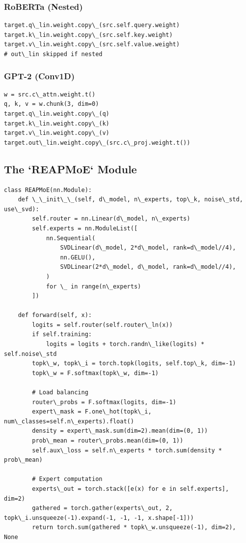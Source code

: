 \subsubsection{RoBERTa (Nested)}

\begin{lstlisting}
target.q\_lin.weight.copy\_(src.self.query.weight)
target.k\_lin.weight.copy\_(src.self.key.weight)
target.v\_lin.weight.copy\_(src.self.value.weight)
# out\_lin skipped if nested
\end{lstlisting}

\subsubsection{GPT-2 (Conv1D)}

\begin{lstlisting}
w = src.c\_attn.weight.t()
q, k, v = w.chunk(3, dim=0)
target.q\_lin.weight.copy\_(q)
target.k\_lin.weight.copy\_(k)
target.v\_lin.weight.copy\_(v)
target.out\_lin.weight.copy\_(src.c\_proj.weight.t())
\end{lstlisting}

\subsection{The `REAPMoE` Module}

\begin{lstlisting}
class REAPMoE(nn.Module):
    def \_\_init\_\_(self, d\_model, n\_experts, top\_k, noise\_std, use\_svd):
        self.router = nn.Linear(d\_model, n\_experts)
        self.experts = nn.ModuleList([
            nn.Sequential(
                SVDLinear(d\_model, 2*d\_model, rank=d\_model//4),
                nn.GELU(),
                SVDLinear(2*d\_model, d\_model, rank=d\_model//4),
            )
            for \_ in range(n\_experts)
        ])
    
    def forward(self, x):
        logits = self.router(self.router\_ln(x))
        if self.training:
            logits = logits + torch.randn\_like(logits) * self.noise\_std
        topk\_w, topk\_i = torch.topk(logits, self.top\_k, dim=-1)
        topk\_w = F.softmax(topk\_w, dim=-1)
        
        # Load balancing
        router\_probs = F.softmax(logits, dim=-1)
        expert\_mask = F.one\_hot(topk\_i, num\_classes=self.n\_experts).float()
        density = expert\_mask.sum(dim=2).mean(dim=(0, 1))
        prob\_mean = router\_probs.mean(dim=(0, 1))
        self.aux\_loss = self.n\_experts * torch.sum(density * prob\_mean)
        
        # Expert computation
        experts\_out = torch.stack([e(x) for e in self.experts], dim=2)
        gathered = torch.gather(experts\_out, 2, topk\_i.unsqueeze(-1).expand(-1, -1, -1, x.shape[-1]))
        return torch.sum(gathered * topk\_w.unsqueeze(-1), dim=2), None
\end{lstlisting}

